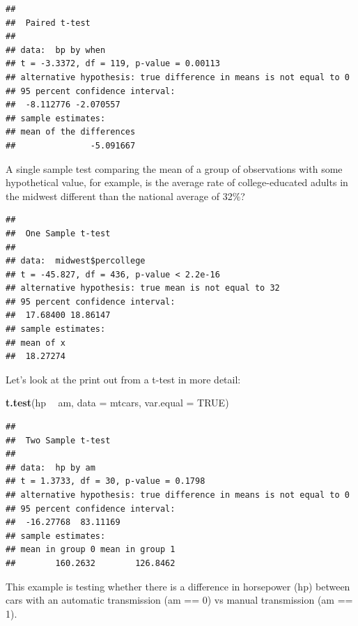 \documentclass[]{book}
\newenvironment{Shaded}{\begin{snugshade}}{\end{snugshade}}
\newcommand{\DataTypeTok}[1]{\textcolor[rgb]{0.13,0.29,0.53}{#1}}
\newcommand{\DecValTok}[1]{\textcolor[rgb]{0.00,0.00,0.81}{#1}}
\newcommand{\KeywordTok}[1]{\textcolor[rgb]{0.13,0.29,0.53}{\textbf{#1}}}
\newcommand{\NormalTok}[1]{#1}
\newcommand{\OperatorTok}[1]{\textcolor[rgb]{0.81,0.36,0.00}{\textbf{#1}}}
\newcommand{\OtherTok}[1]{\textcolor[rgb]{0.56,0.35,0.01}{#1}}
\newcommand{\StringTok}[1]{\textcolor[rgb]{0.31,0.60,0.02}{#1}}
\begin{document}
\begin{verbatim}
## 
##  Paired t-test
## 
## data:  bp by when
## t = -3.3372, df = 119, p-value = 0.00113
## alternative hypothesis: true difference in means is not equal to 0
## 95 percent confidence interval:
##  -8.112776 -2.070557
## sample estimates:
## mean of the differences 
##               -5.091667
\end{verbatim}

A single sample test comparing the mean of a group of observations with some hypothetical value, for example, is the average rate of college-educated adults in the midwest different than the national average of 32\%?

\begin{Shaded}
\end{Shaded}

\begin{verbatim}
## 
##  One Sample t-test
## 
## data:  midwest$percollege
## t = -45.827, df = 436, p-value < 2.2e-16
## alternative hypothesis: true mean is not equal to 32
## 95 percent confidence interval:
##  17.68400 18.86147
## sample estimates:
## mean of x 
##  18.27274
\end{verbatim}

Let's look at the print out from a t-test in more detail:

\begin{Shaded}
\begin{Highlighting}[]
\KeywordTok{t.test}\NormalTok{(hp }\OperatorTok{~}\StringTok{ }\NormalTok{am, }\DataTypeTok{data =}\NormalTok{ mtcars, }\DataTypeTok{var.equal =} \OtherTok{TRUE}\NormalTok{)}
\end{Highlighting}
\end{Shaded}

\begin{verbatim}
## 
##  Two Sample t-test
## 
## data:  hp by am
## t = 1.3733, df = 30, p-value = 0.1798
## alternative hypothesis: true difference in means is not equal to 0
## 95 percent confidence interval:
##  -16.27768  83.11169
## sample estimates:
## mean in group 0 mean in group 1 
##        160.2632        126.8462
\end{verbatim}

This example is testing whether there is a difference in horsepower (hp) between cars with an automatic transmission (am == 0) vs manual transmission (am == 1).
\end{document}
